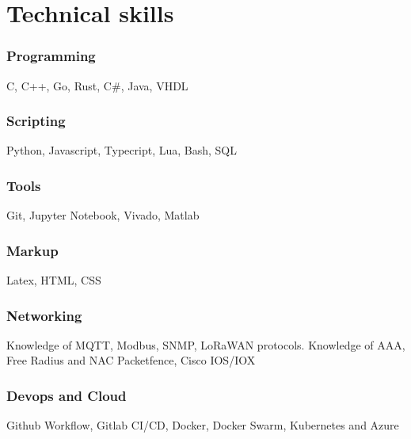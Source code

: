 \documentclass[11pt,a4paper]{article}
\begin{document}
  \section{Technical skills}
  \subsubsection{Programming}
  C, C++, Go, Rust, C\#, Java, VHDL

  \subsubsection{Scripting}
  Python, Javascript, Typecript, Lua, Bash, SQL

  \subsubsection{Tools}
  Git, Jupyter Notebook, Vivado, Matlab

  \subsubsection{Markup}
  Latex, HTML, CSS

  \subsubsection{Networking}
  Knowledge of MQTT, Modbus, SNMP, LoRaWAN protocols. Knowledge of AAA, Free Radius and NAC Packetfence, Cisco IOS/IOX

  \subsubsection{Devops and Cloud}
  Github Workflow, Gitlab CI/CD, Docker, Docker Swarm, Kubernetes and Azure

\end{document}

